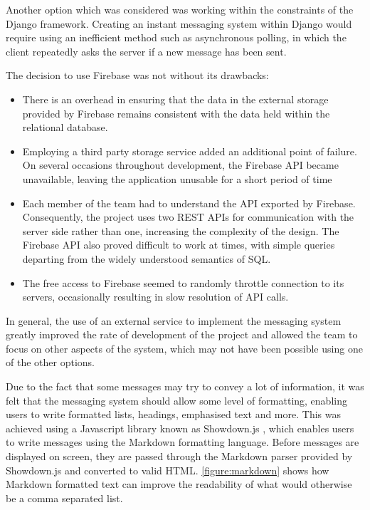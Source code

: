 \documentclass[a4paper]{l3proj}
\begin{document}
Another option which was considered was working within the constraints of the Django framework. Creating an instant messaging system within Django would require using an inefficient method such as asynchronous polling, in which the client repeatedly asks the server if a new message has been sent.

The decision to use Firebase was not without its drawbacks:
\begin{itemize}
\item There is an overhead in ensuring that the data in the external storage provided by Firebase remains consistent with the data held within the relational database.
\item Employing a third party storage service added an additional point of failure. On several occasions throughout development, the Firebase API became unavailable, leaving the application unusable for a short period of time
\item Each member of the team had to understand the API exported by Firebase. Consequently, the project uses two REST APIs for communication with the server side rather than one, increasing the complexity of the design. The Firebase API also proved difficult to work at times, with simple queries departing from the widely understood semantics of SQL.
\item The free access to Firebase seemed to randomly throttle connection to its servers, occasionally resulting in slow resolution of API calls.
\end{itemize}

In general, the use of an external service to implement the messaging system greatly improved the rate of development of the project and allowed the team to focus on other aspects of the system, which may not have been possible using one of the other options.

Due to the fact that some messages may try to convey a lot of information, it was felt that the messaging system should allow some level of formatting, enabling users to write formatted lists, headings, emphasised text and more. This was achieved using a Javascript library known as Showdown.js \cite{site:showdown}, which enables users to write messages using the Markdown \cite{site:markdown} formatting language. Before messages are displayed on screen, they are passed through the Markdown parser provided by Showdown.js and converted to valid HTML. \autoref{figure:markdown} shows how Markdown formatted text can improve the readability of what would otherwise be a comma separated list.
\end{document}

